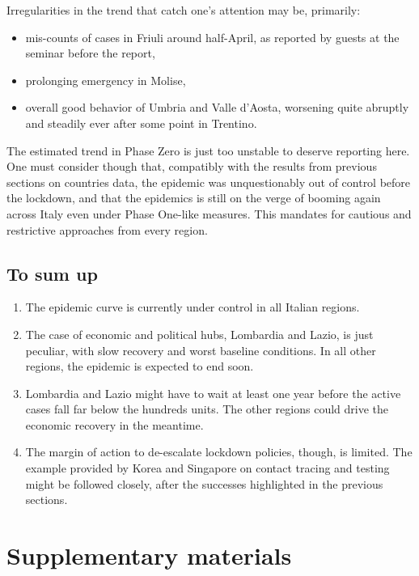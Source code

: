 \documentclass[
  6pt,
]{article}
\providecommand{\tightlist}{%
  \setlength{\itemsep}{0pt}\setlength{\parskip}{0pt}}
\begin{document}
Irregularities in the trend that catch one's attention may be,
primarily:

\begin{itemize}
\tightlist
\item
  mis-counts of cases in Friuli around half-April, as reported by guests
  at the seminar before the report,
\item
  prolonging emergency in Molise,
\item
  overall good behavior of Umbria and Valle d'Aosta, worsening quite
  abruptly and steadily ever after some point in Trentino.
\end{itemize}

The estimated trend in Phase Zero is just too unstable to deserve
reporting here. One must consider though that, compatibly with the
results from previous sections on countries data, the epidemic was
unquestionably out of control before the lockdown, and that the
epidemics is still on the verge of booming again across Italy even under
Phase One-like measures. This mandates for cautious and restrictive
approaches from every region.

\hypertarget{to-sum-up-1}{%
\subsection{To sum up}\label{to-sum-up-1}}

\begin{enumerate}
\def\labelenumi{\arabic{enumi}.}
\item
  The epidemic curve is currently under control in all Italian regions.
\item
  The case of economic and political hubs, Lombardia and Lazio, is just
  peculiar, with slow recovery and worst baseline conditions. In all
  other regions, the epidemic is expected to end soon.
\item
  Lombardia and Lazio might have to wait at least one year before the
  active cases fall far below the hundreds units. The other regions
  could drive the economic recovery in the meantime.
\item
  The margin of action to de-escalate lockdown policies, though, is
  limited. The example provided by Korea and Singapore on contact
  tracing and testing might be followed closely, after the successes
  highlighted in the previous sections.
\end{enumerate}

\hypertarget{supplementary-materials}{%
\section{Supplementary materials}\label{supplementary-materials}}
\end{document}
